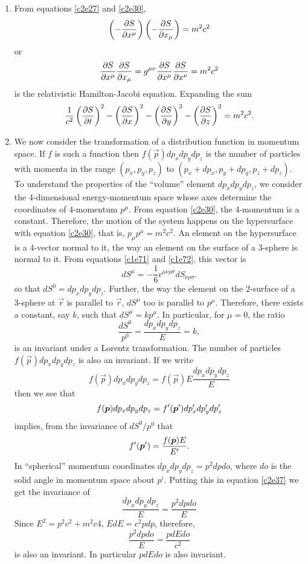 \begin{enumerate}
\item From equations \eqref{c2e27} and \eqref{c2e30},
\[
\left(-\frac{\partial{S}}{\partial{x^\mu}}\right)\left(-\frac{\partial{S}}{\partial{x_\mu}}\right) = m^2c^2
\]
or
\begin{equation}\label{c2e34}
\frac{\partial{S}}{\partial{x^\mu}}\frac{\partial{S}}{\partial{x_\mu}} = g^{\mu\nu}\frac{\partial{S}}{\partial{x^\mu}}\frac{\partial{S}}{\partial{x^\nu}} = m^2c^2
\end{equation}
is the relativistic Hamilton-Jacobi equation. Expanding the sum
\begin{equation}\label{c2e35}
\frac{1}{c^2}\left(\frac{\partial{S}}{\partial{t}}\right)^2 - \left(\frac{\partial{S}}{\partial{x}}\right)^2 
- \left(\frac{\partial{S}}{\partial{y}}\right)^2 - \left(\frac{\partial{S}}{\partial{z}}\right)^2 = m^2c^2.
\end{equation}

\item We now consider the transformation of a distribution function in momentum
space. If $f$ is such a function then $f(\vec{p})dp_xdp_ydp_z$ is the number of
particles with momenta in the range $(p_x, p_y, p_z)$ to $(p_x + dp_x, p_y + dp_y,
p_z + dp_z)$. To understand the properties of the ``volume'' element $dp_xdp_ydp_z$,
we consider the 4-dimensional energy-momentum space whose axes determine the
coordinates of 4-momentum $p^\mu$. From equation \eqref{c2e30}, the 4-momentum is
a constant. Therefore, the motion of the system happens on the hypersurface with
equation \eqref{c2e30}, that is, $p_\mu p^\mu = m^2c^2$. An element on the 
hypersurface is a 4-vector normal to it, the way an element on the surface of a 
3-sphere is normal to it. From equations \eqref{c1e71} and \eqref{c1e72}, this
vector is
\begin{equation}\label{c2e36}
dS^\mu = -\frac{1}{6}\epsilon^{\mu\nu\rho\sigma}dS_{\nu\rho\sigma}.
\end{equation}
so that $dS^0 = dp_xdp_ydp_z$. Further, the way the element on the 2-surface of
a 3-sphere at $\vec{r}$ is parallel to $\vec{r}$, $dS^\mu$ too is parallel to 
$p^\mu$. Therefore, there exists a constant, say $k$, such that $dS^\mu = kp^\mu$.
In particular, for $\mu = 0$, the ratio
\begin{equation}\label{c2e37}
\frac{dS^0}{p^0} = \frac{dp_xdp_ydp_z}{E} = k,
\end{equation}
is an invariant under a Lorentz transformation. The number of particles $f(\vec{p})
dp_xdp_ydp_z$ is also an invariant. If we write
\[
f(\vec{p})dp_xdp_ydp_z = f(\vec{p})E\frac{dp_xdp_ydp_z}{E}
\]
then we see that
\[
f(\boldsymbol{p})dp_xdp_ydp_z = f^\prime(\boldsymbol{p}^\prime)dp_x^\prime dp_y^\prime dp_z^\prime
\]
implies, from the invariance of $dS^0/p^0$ that
\begin{equation}\label{c2e38}
f^\prime(\boldsymbol{p}^\prime) = \frac{f(\boldsymbol{p})E}{E^\prime}.
\end{equation}
In ``spherical'' momentum coordinates $dp_xdp_ydp_z = p^2dpdo$, where $do$ is the
solid angle in momentum space about $p^i$. Putting this in equation \eqref{c2e37}
we get the invariance of
\[
\frac{dp_xdp_ydp_z}{E} = \frac{p^2dpdo}{E} 
\]
Since $E^2 = p^2c^2 + m^2c4$, $EdE = c^2 pdp$, therefore,
\[
\frac{p^2dpdo}{E} = \frac{pdEdo}{c^2}
\]
is also an invariant. In particular $pdEdo$ is also invariant.


\end{enumerate}
